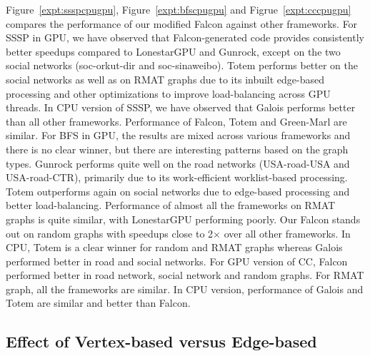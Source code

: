 Figure~\ref{expt:ssspcpugpu}, Figure~\ref{expt:bfscpugpu} and Figrue~\ref{expt:cccpugpu} compares the performance of our modified Falcon against other frameworks.
For SSSP in GPU, we have observed that Falcon-generated code provides consistently better speedups compared to LonestarGPU and Gunrock, except on the two social networks (soc-orkut-dir and soc-sinaweibo).
Totem performs better on the social networks as well as on RMAT graphs due to its inbuilt edge-based processing and other optimizations to improve load-balancing across GPU threads.
In CPU version of SSSP, we have observed that Galois performs better than all other frameworks. Performance of Falcon, Totem and Green-Marl are similar.
For BFS in GPU, the results are mixed across various frameworks and there is no clear winner, but there are interesting patterns based on the graph types.
Gunrock performs quite well on the road networks (USA-road-USA and USA-road-CTR), primarily due to its work-efficient worklist-based processing.
Totem outperforms again on social networks due to edge-based processing and better load-balancing.
Performance of almost all the frameworks on RMAT graphs is quite similar, with LonestarGPU performing poorly.
Our Falcon stands out on random graphs with speedups close to 2$\times$ over all other frameworks.
In CPU, Totem is a clear winner for random and RMAT graphs whereas Galois performed better in road and social networks.
For GPU version of CC, Falcon performed better in road network, social network and random graphs. For RMAT graph, all the frameworks are similar.
In CPU version, performance of Galois and Totem are similar and better than Falcon.



\subsection{Effect of Vertex-based versus Edge-based}\label{expt:vertexedge}

